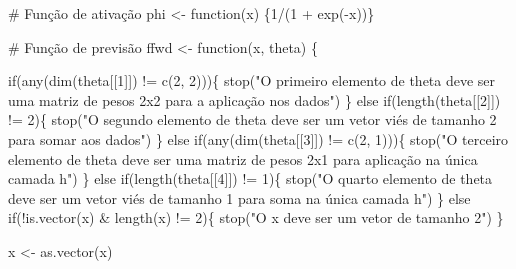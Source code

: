 \documentclass[
  a4paperpaper,
]{article}
\newenvironment{Shaded}{\begin{snugshade}}{\end{snugshade}}
\newcommand{\CommentTok}[1]{\textcolor[rgb]{0.37,0.37,0.37}{#1}}
\newcommand{\ControlFlowTok}[1]{\textcolor[rgb]{0.00,0.23,0.31}{#1}}
\newcommand{\DecValTok}[1]{\textcolor[rgb]{0.68,0.00,0.00}{#1}}
\newcommand{\FunctionTok}[1]{\textcolor[rgb]{0.28,0.35,0.67}{#1}}
\newcommand{\NormalTok}[1]{\textcolor[rgb]{0.00,0.23,0.31}{#1}}
\newcommand{\OtherTok}[1]{\textcolor[rgb]{0.00,0.23,0.31}{#1}}
\newcommand{\SpecialCharTok}[1]{\textcolor[rgb]{0.37,0.37,0.37}{#1}}
\newcommand{\StringTok}[1]{\textcolor[rgb]{0.13,0.47,0.30}{#1}}
\begin{document}
\begin{Shaded}
\begin{Highlighting}[]
\CommentTok{\# Função de ativação}
\NormalTok{phi }\OtherTok{\textless{}{-}} \ControlFlowTok{function}\NormalTok{(x) \{}\DecValTok{1}\SpecialCharTok{/}\NormalTok{(}\DecValTok{1} \SpecialCharTok{+} \FunctionTok{exp}\NormalTok{(}\SpecialCharTok{{-}}\NormalTok{x))\}}

\CommentTok{\# Função de previsão}
\NormalTok{ffwd }\OtherTok{\textless{}{-}} \ControlFlowTok{function}\NormalTok{(x, theta) \{}
  
  \ControlFlowTok{if}\NormalTok{(}\FunctionTok{any}\NormalTok{(}\FunctionTok{dim}\NormalTok{(theta[[}\DecValTok{1}\NormalTok{]]) }\SpecialCharTok{!=} \FunctionTok{c}\NormalTok{(}\DecValTok{2}\NormalTok{, }\DecValTok{2}\NormalTok{)))\{}
    \FunctionTok{stop}\NormalTok{(}\StringTok{"O primeiro elemento de theta deve ser uma matriz de pesos 2x2 para a aplicação nos dados"}\NormalTok{)}
\NormalTok{  \} }\ControlFlowTok{else} \ControlFlowTok{if}\NormalTok{(}\FunctionTok{length}\NormalTok{(theta[[}\DecValTok{2}\NormalTok{]]) }\SpecialCharTok{!=} \DecValTok{2}\NormalTok{)\{}
    \FunctionTok{stop}\NormalTok{(}\StringTok{"O segundo elemento de theta deve ser um vetor viés de tamanho 2 para somar aos dados"}\NormalTok{)}
\NormalTok{  \} }\ControlFlowTok{else} \ControlFlowTok{if}\NormalTok{(}\FunctionTok{any}\NormalTok{(}\FunctionTok{dim}\NormalTok{(theta[[}\DecValTok{3}\NormalTok{]]) }\SpecialCharTok{!=} \FunctionTok{c}\NormalTok{(}\DecValTok{2}\NormalTok{, }\DecValTok{1}\NormalTok{)))\{}
    \FunctionTok{stop}\NormalTok{(}\StringTok{"O terceiro elemento de theta deve ser uma matriz de pesos 2x1 para aplicação na única camada h"}\NormalTok{)}
\NormalTok{  \} }\ControlFlowTok{else} \ControlFlowTok{if}\NormalTok{(}\FunctionTok{length}\NormalTok{(theta[[}\DecValTok{4}\NormalTok{]]) }\SpecialCharTok{!=} \DecValTok{1}\NormalTok{)\{}
    \FunctionTok{stop}\NormalTok{(}\StringTok{"O quarto elemento de theta deve ser um vetor viés de tamanho 1 para soma na única camada h"}\NormalTok{)}
\NormalTok{  \} }\ControlFlowTok{else} \ControlFlowTok{if}\NormalTok{(}\SpecialCharTok{!}\FunctionTok{is.vector}\NormalTok{(x) }\SpecialCharTok{\&} \FunctionTok{length}\NormalTok{(x) }\SpecialCharTok{!=} \DecValTok{2}\NormalTok{)\{}
    \FunctionTok{stop}\NormalTok{(}\StringTok{"O x deve ser um vetor de tamanho 2"}\NormalTok{)}
\NormalTok{  \}}
  
\NormalTok{  x }\OtherTok{\textless{}{-}} \FunctionTok{as.vector}\NormalTok{(x)}
  

\end{Highlighting}
\end{Shaded}
\end{document}
